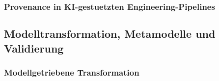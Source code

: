 %
%
%
%
%
%


\subsubsection{Provenance in KI-gestuetzten Engineering-Pipelines}
\label{sec:ai_provenance}

%
%
%
%
%
%
%


\subsection{Modelltransformation, Metamodelle und Validierung}
\label{sec:model_validation}

\subsubsection{Modellgetriebene Transformation}
\label{sec:model_driven_transformation}

